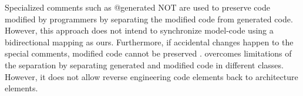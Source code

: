 \noindent
{}
Specialized comments \cite{steinberg2008emf} such as \textsf{@generated NOT} are used to preserve code modified by programmers by separating the modified code from generated code. 
However, this approach does not intend to synchronize model-code using a bidirectional mapping as ours.
Furthermore, if accidental changes happen to the special comments, modified code cannot be preserved \cite{zheng2012enhancing}.
 \cite{zheng2012enhancing} overcomes limitations of the separation by separating generated and modified code in different classes.
However, %
it does not allow reverse engineering code elements back to architecture elements.  




 


